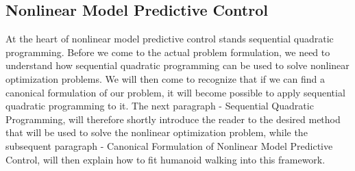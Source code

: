 \subsection{Nonlinear Model Predictive Control}
\label{sec::312_nmpc}
At the heart of nonlinear model predictive control stands sequential quadratic programming. Before we come to the actual problem formulation, we need to understand how sequential quadratic programming can be used to solve nonlinear optimization problems. We will then come to recognize that if we can find a canonical formulation of our problem, it will become possible to apply sequential quadratic programming to it. The next paragraph - Sequential Quadratic Programming, will therefore shortly introduce the reader to the desired method that will be used to solve the  nonlinear optimization problem, while the subsequent paragraph - Canonical Formulation of Nonlinear Model Predictive Control, will then explain how to fit humanoid walking into this framework.
